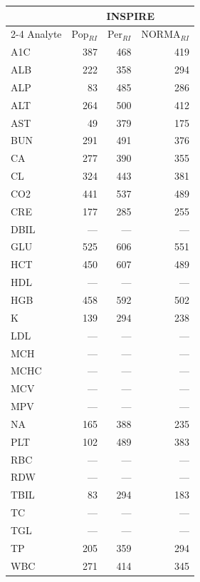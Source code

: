 \begin{table}[ht]
\centering
\footnotesize
\begin{tabular}{lrrr}
\toprule
 & \multicolumn{3}{c}{INSPIRE} \\
\cmidrule(lr){2-4}
Analyte & Pop$_{RI}$ & Per$_{RI}$ & NORMA$_{RI}$ \\
\midrule
A1C & 387 & 468 & 419 \\
ALB & 222 & 358 & 294 \\
ALP & 83 & 485 & 286 \\
ALT & 264 & 500 & 412 \\
AST & 49 & 379 & 175 \\
BUN & 291 & 491 & 376 \\
CA & 277 & 390 & 355 \\
CL & 324 & 443 & 381 \\
CO2 & 441 & 537 & 489 \\
CRE & 177 & 285 & 255 \\
DBIL & --- & --- & --- \\
GLU & 525 & 606 & 551 \\
HCT & 450 & 607 & 489 \\
HDL & --- & --- & --- \\
HGB & 458 & 592 & 502 \\
K & 139 & 294 & 238 \\
LDL & --- & --- & --- \\
MCH & --- & --- & --- \\
MCHC & --- & --- & --- \\
MCV & --- & --- & --- \\
MPV & --- & --- & --- \\
NA & 165 & 388 & 235 \\
PLT & 102 & 489 & 383 \\
RBC & --- & --- & --- \\
RDW & --- & --- & --- \\
TBIL & 83 & 294 & 183 \\
TC & --- & --- & --- \\
TGL & --- & --- & --- \\
TP & 205 & 359 & 294 \\
WBC & 271 & 414 & 345 \\
\bottomrule
\end{tabular}
\label{tab:07_prevalence_interpretable}
\end{table}